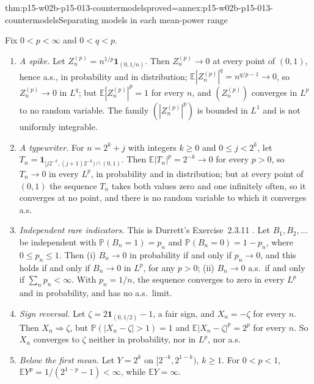 \begin{hbtheorem}{thm:p15-w02b-p15-013-countermodels}{proved=annex:p15-w02b-p15-013-countermodels}{Separating models in each mean-power range}
\par\nobreak
Fix \(0<p<\infty\) and \(0<q<p\).
\begin{enumerate}
\item \emph{A spike.} Let \(Z^{(p)}_n=n^{1/p}\mathbf1_{(0,1/n)}\).
      Then \(Z^{(p)}_n\to0\) at every point of \((0,1)\), hence a.s.,
      in probability and in distribution; \(\mathbb E|Z^{(p)}_n|^q=
      n^{q/p-1}\to0\), so \(Z^{(p)}_n\to0\) in \(L^q\); but
      \(\mathbb E|Z^{(p)}_n|^p=1\) for every \(n\), and
      \((Z^{(p)}_n)\) converges in \(L^p\) to no random variable.
      The family \((|Z^{(p)}_n|^p)\) is bounded in \(L^1\) and is not
      uniformly integrable.
\item \emph{A typewriter.} For \(n=2^k+j\) with integers \(k\geq0\) and
      \(0\leq j<2^k\), let
      \(T_n=\mathbf1_{[j2^{-k},(j+1)2^{-k})\cap(0,1)}\). Then
      \(\mathbb E|T_n|^p=2^{-k}\to0\) for every \(p>0\), so
      \(T_n\to0\) in every \(L^p\), in probability and in distribution;
      but at every point of \((0,1)\) the sequence \(T_n\) takes both
      values zero and one infinitely often, so it converges at no point,
      and there is no random variable to which it converges a.s.
\item \emph{Independent rare indicators.} This is Durrett's
      Exercise~2.3.11 \cite[p.~75]{DurrettPTEAuthor2019}. Let
      \(B_1,B_2,\ldots\) be independent with \(\mathbb P(B_n=1)=p_n\) and
      \(\mathbb P(B_n=0)=1-p_n\), where \(0\leq p_n\leq1\). Then
      (i) \(B_n\to0\) in probability if and only if \(p_n\to0\), and
      this holds if and only if \(B_n\to0\) in \(L^p\), for any
      \(p>0\); (ii) \(B_n\to0\) a.s.\ if and only if
      \(\sum_np_n<\infty\). With \(p_n=1/n\), the sequence converges to
      zero in every \(L^p\) and in probability, and has no a.s.\ limit.
\item \emph{Sign reversal.} Let \(\zeta=2\mathbf1_{(0,1/2)}-1\),
      a fair sign, and \(X_n=-\zeta\) for every \(n\). Then
      \(X_n\Rightarrow\zeta\), but
      \(\mathbb P(|X_n-\zeta|>1)=1\) and
      \(\mathbb E|X_n-\zeta|^p=2^p\) for every \(n\). So
      \(X_n\) converges to \(\zeta\) neither in probability, nor
      in \(L^p\), nor a.s.
\item \emph{Below the first mean.} Let \(Y=2^k\) on
      \([2^{-k},2^{1-k})\), \(k\geq1\). For \(0<p<1\),
      \(\mathbb EY^p=1/(2^{1-p}-1)<\infty\), while \(\mathbb EY=\infty\).

\end{enumerate}
\end{hbtheorem}
